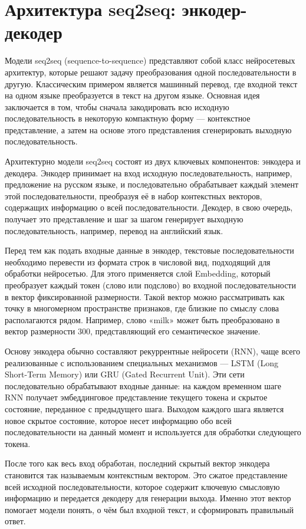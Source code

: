 \section{Архитектура seq2seq: энкодер-декодер}

Модели seq2seq (sequence-to-sequence) представляют собой класс нейросетевых архитектур, которые решают задачу преобразования одной последовательности в другую. Классическим примером является машинный перевод, где входной текст на одном языке преобразуется в текст на другом языке. Основная идея заключается в том, чтобы сначала закодировать всю исходную последовательность в некоторую компактную форму — контекстное представление, а затем на основе этого представления сгенерировать выходную последовательность.

Архитектурно модели seq2seq состоят из двух ключевых компонентов: энкодера и декодера. Энкодер принимает на вход исходную последовательность, например, предложение на русском языке, и последовательно обрабатывает каждый элемент этой последовательности, преобразуя её в набор контекстных векторов, содержащих информацию о всей последовательности. Декодер, в свою очередь, получает это представление и шаг за шагом генерирует выходную последовательность, например, перевод на английский язык.

Перед тем как подать входные данные в энкодер, текстовые последовательности необходимо перевести из формата строк в числовой вид, подходящий для обработки нейросетью. Для этого применяется слой Embedding, который преобразует каждый токен (слово или подслово) во входной последовательности в вектор фиксированной размерности. Такой вектор можно рассматривать как точку в многомерном пространстве признаков, где близкие по смыслу слова располагаются рядом. Например, слово «milk» может быть преобразовано в вектор размерности 300, представляющий его семантическое значение.\cite{habrseq2seq}

Основу энкодера обычно составляют рекуррентные нейросети (RNN), чаще всего реализованные с использованием специальных механизмов — LSTM (Long Short-Term Memory) или GRU (Gated Recurrent Unit). Эти сети последовательно обрабатывают входные данные: на каждом временном шаге RNN получает эмбеддинговое представление текущего токена и скрытое состояние, переданное с предыдущего шага. Выходом каждого шага является новое скрытое состояние, которое несет информацию обо всей последовательности на данный момент и используется для обработки следующего токена.

После того как весь вход обработан, последний скрытый вектор энкодера становится так называемым контекстным вектором. Это сжатое представление всей исходной последовательности, которое содержит ключевую смысловую информацию и передается декодеру для генерации выхода. Именно этот вектор помогает модели понять, о чём был входной текст, и сформировать правильный ответ.

